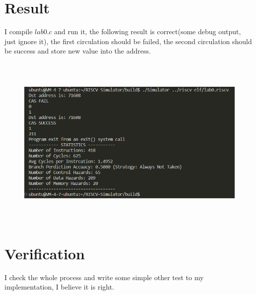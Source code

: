 \documentclass{article}
\begin{document}
\section{Result}
I compile $lab0.c$ and run it, the following result is correct(some debug output, just ignore it), the first circulation should be failed, the second circulation should be success and store new value into the address.
\begin{figure}[!h]
\centering 
\includegraphics[height=8.5cm,width=14cm]{result.png}
\end{figure}

\section{Verification}
I check the whole process and write some simple other test to my implementation, I believe it is right.
\end{document}
